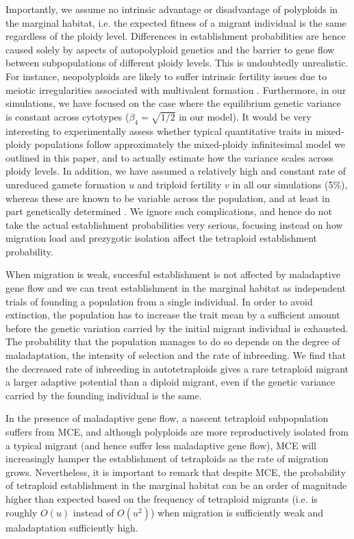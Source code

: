 \documentclass[12pt,a4paper]{article}
\begin{document}
Importantly, we assume no intrinsic advantage or disadvantage of polyploids in
the marginal habitat, i.e. the expected fitness of a migrant individual is the
same regardless of the ploidy level.
Differences in establishment probabilities are hence caused solely by aspects
of autopolyploid genetics and the barrier to gene flow between subpopulations
of different ploidy levels.
This is undoubtedly unrealistic.
For instance, neopolyploids are likely to suffer intrinsic fertility issues due
to meiotic irregularities associated with multivalent formation
\citep{bomblies2016,novikova2023}.
Furthermore, in our simulations, we have focused on the case where the
equilibrium genetic variance is constant across cytotypes ($\beta_4=\sqrt{1/2}$
in our model).
It would be very interesting to experimentally assess whether typical
quantitative traits in mixed-ploidy populations follow approximately the
mixed-ploidy infinitesimal model we outlined in this paper, and to actually
estimate how the variance scales across ploidy levels.
In addition, we have assumed a relatively high and constant rate of unreduced
gamete formation $u$ and triploid fertility $v$ in all our simulations (5\%),
whereas these are known to be variable across the population, and at least in
part genetically determined \citep{kreiner2017,clo2022c}.
We ignore such complications, and hence do not take the actual establishment
probabilities very serious, focusing instead on how migration load and
prezygotic isolation affect the tetraploid establishment probability.

When migration is weak, succesful establishment is not affected by
maladaptive gene flow and we can treat establishment in the marginal habitat as
independent trials of founding a population from a single individual.
In order to avoid extinction, the population has to increase the trait mean
by a sufficient amount before the genetic variation carried by the initial
migrant individual is exhausted.
The probability that the population manages to do so depends on the degree of
maladaptation, the intensity of selection and the rate of inbreeding.
We find that the decreased rate of inbreeding in autotetraploids gives a
rare tetraploid migrant a larger adaptive potential than a diploid migrant,
even if the genetic variance carried by the founding individual is the same.

In the presence of maladaptive gene flow, a nascent tetraploid subpopulation
suffers from MCE, and although polyploids are more reproductively isolated from
a typical migrant (and hence suffer less maladaptive gene flow), MCE will
increasingly hamper the establishment of tetraploids as the rate of migration
grows.
Nevertheless, it is important to remark that despite MCE, the probability of
tetraploid establishment in the marginal habitat can be an order of magnitude
higher than expected based on the frequency of tetraploid migrants (i.e. is
roughly $O(u)$ instead of $O(u^2)$) when migration is sufficiently weak and
maladaptation sufficiently high.
\end{document}
